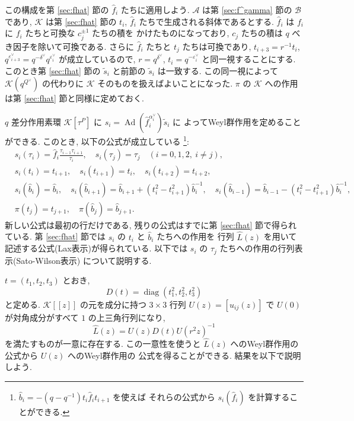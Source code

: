 \documentclass[12pt,twoside,dvipdfm]{msjproc}
\theoremstyle{definition} %
\theoremstyle{definition} %
\theoremstyle{definition} %
\numberwithin{theorem}{section}
\numberwithin{equation}{section}
\numberwithin{figure}{section}
\numberwithin{table}{section}
\newcommand\secref[1]{第 \ref{#1} 節}
\newcommand\A{\mathcal{A}}
\newcommand\K{\mathcal{K}}
\newcommand\B{\mathcal{B}}
\newcommand\diag{\mathop{\mathrm{diag}}\nolimits}
\newcommand\Ad{\mathop{\mathrm{Ad}}\nolimits}
\newcommand\ts{{\tilde{s}}}
\newcommand\hL{{\widehat{L}}}
\newcommand\hb{{\hat{b}}}
\newcommand\hf{{\hat{f}}}
\newcommand\ev{\varepsilon^\vee}
\newcommand\av{\alpha^\vee}
\newcommand\dv{\delta^\vee}
\newcommand\Qv{{Q^\vee}}
\begin{document}
この構成を\secref{sec:fhat}の $\hf_i$ たちに適用しよう.
$\A$ は\secref{sec:f^gamma}の $\B$ であり, 
$\K$ は\secref{sec:fhat}の $t_i$, $\hf_i$ たちで生成される斜体であるとする.
$\hf_i$ は $f_i$ に $f_i$ たちと可換な $c_j^{\pm1}$ たちの積を
かけたものになっており, $c_j$ たちの積は $q$ べき因子を除いて可換である.
さらに $\hf_i$ たちと $t_j$ たちは可換であり, $t_{i+3}=r^{-1}t_i$, 
$q^{\ev_{i+3}}=q^{-\dv}q^{\ev_i}$ が成立しているので, 
$r=q^{\dv}$, $t_i=q^{-\ev_i}$ と同一視することにする.
このとき\secref{sec:fhat}の $\ts_i$ と前節の $\ts_i$ は一致する.
この同一視によって $\K(q^\Qv)$ の代わりに $\K$ そのものを扱えばよいことになった.
$\pi$ の $\K$ への作用は\secref{sec:fhat}と同様に定めておく.

$q$ 差分作用素環 $\K[\tau^P]$ に $s_i=\Ad(\hf_i^{\av_i})\ts_i$ に
よってWeyl群作用を定めることができる. このとき, 以下の公式が成立している%
\footnote{$\hb_i=-(q-q^{-1})t_i\hf_i t_{i+1}$ を使えば
それらの公式から $s_i(\hf_i)$ を計算することができる.}:
\begin{align*}
 &
 s_i(\tau_i) = \hf_i \frac{\tau_{i-1}\tau_{i+1}}{\tau_i}, \quad
 s_i(\tau_j) = \tau_j \quad
 (i=0,1,2,\ i\ne j),
 \\ &
 s_i(t_i) = t_{i+1}, \quad
 s_i(t_{i+1}) = t_i, \quad
 s_i(t_{i+2}) = t_{i+2},
 \\ &
 s_i(\hb_i) = \hb_i, \quad
 s_i(\hb_{i+1}) = \hb_{i+1} + (t_i^2-t_{i+1}^2)\hb_i^{-1}, \quad
 s_i(\hb_{i-1}) = \hb_{i-1} - (t_i^2-t_{i+1}^2)\hb_i^{-1},
 \\ &
 \pi(t_j) = t_{j+1}, \quad
 \pi(\hb_j) = \hb_{j+1}.
\end{align*}
新しい公式は最初の行だけである, 
残りの公式はすでに\secref{sec:fhat}で得られている.
\secref{sec:fhat}では $s_i$ の $t_i$ と $\hb_i$ たちへの作用を
行列 $\hL(z)$ を用いて記述する公式(Lax表示)が得られている.
以下では $s_i$ の $\tau_j$ たちへの作用の行列表示(Sato-Wilson表示)
について説明する.

$t=(t_1,t_2,t_3)$ とおき,
\begin{equation*}
 D(t)=\diag(t_1^2,t_2^2,t_3^2)
\end{equation*}
と定める.
$\K[[z]]$ の元を成分に持つ $3\times 3$ 行列 $U(z)=[u_{ij}(z)]$ 
で $U(0)$ が対角成分がすべて $1$ の上三角行列になり, 
\begin{equation*}
  \hL(z) = U(z)D(t)U(r^2z)^{-1}
\end{equation*}
を満たすものが一意に存在する.  
この一意性を使うと $\hL(z)$ へのWeyl群作用の公式から $U(z)$ へのWeyl群作用の
公式を得ることができる. 結果を以下で説明しよう.
\end{document}
